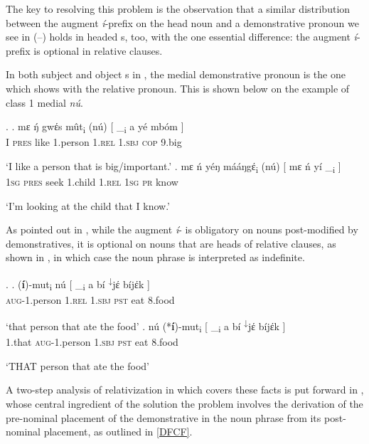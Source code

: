 The key to resolving this problem is the observation that a similar distribution between the  augment \textit{\'i}-prefix on the head noun and a demonstrative pronoun we see in (--) holds in headed s, too, with the one essential difference: the augment \textit{\'i}-prefix is optional in relative clauses.
\par 
In both subject and object s in , the medial demonstrative pronoun is the one which shows  with the relative pronoun. This is  shown below on the example of class 1 medial \textit{n\'u}.

\ex. \citet[153--4]{Makasso2010}\label{Bas:big}
\ag. 
mɛ ŋ́ gwέs m\^ut\textsubscript{i} (n\'u)  [ \_\textsubscript{i}  a y\'e mb\'om ] \\
I \textsc{pres} like 1.person 1.\textsc{rel} {} {} 1.\textsc{sbj} \textsc{cop} 9.big\\
\strut `I like a person that is big/important.' 
\bg. 
mɛ \'n y\'eŋ m\'a\'aŋgέ\textsubscript{i} (n\'u) [ mɛ \'n y\'i \_\textsubscript{i} ]\\
\textsc{1sg} \textsc{pres} seek 1.child \textsc{1.rel} {} \textsc{1sg} \textsc{pr} know\\
\strut `I'm looking at the child that I know.' 

As pointed out in \citet{Makasso2010}, while the augment \textit{\'i}- is obligatory on nouns post-modified by demonstratives, it is optional on nouns that are heads of relative clauses, as shown in \Next, in which case the noun phrase is interpreted as indefinite.

\ex.
\ag.
(\textbf{\'i})-mut\textsubscript{i} n\'u [ \_\textsubscript{i} a b\'i \textsuperscript{↓}jέ b\'ijέk ]\\
\textsc{aug}-1.person 1.\textsc{rel} {} {} \textsc{1.sbj} \textsc{pst} eat 8.food {}\\
\strut `that person that ate the food'\label{RelC:i}
\bg.
n\'u (*\textbf{\'i})-mut\textsubscript{i} [ \_\textsubscript{i} a b\'i \textsuperscript{↓}jέ b\'ijέk ]\\
1.that \textsc{aug}-1.person {} {} \textsc{1.sbj} \textsc{pst} eat 8.food\\
\strut `THAT person that ate the food'\label{RelC:senza-i}


\noindent A two-step analysis of relativization in  which covers these facts is put forward in \cite{Jenks-etall}, whose central ingredient of the solution the  problem involves the derivation of the pre-nominal placement of the demonstrative in the noun phrase from its post-nominal placement, as outlined in \ref{DFCF}.

